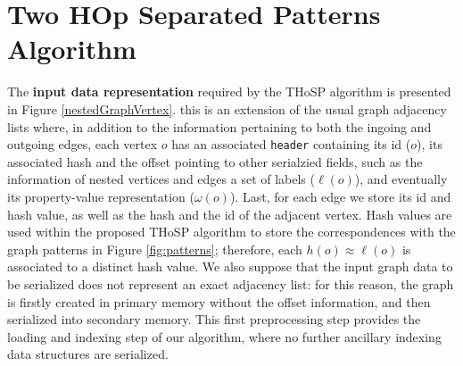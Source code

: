 \section{Two HOp Separated Patterns Algorithm}
\label{sec:THOSPA}


The \textbf{input data  representation} required by the THoSP algorithm is presented in Figure \ref{nestedGraphVertex}. this is an extension of the usual graph adjacency lists where, in addition to the information pertaining to both the ingoing and outgoing edges, each vertex $o$ has an associated \texttt{header} containing its id ($o$), its associated hash and the offset pointing to other serialzied fields, such as the information of   nested vertices and edges a set of labels ($\ell(o)$), and eventually its property-value representation ($\omega(o)$). Last, for each edge we store its id and hash value, as well as the hash and the id of the adjacent vertex. Hash values are used within the proposed THoSP algorithm to store the correspondences with the graph patterns in Figure \ref{fig:patterns}; therefore, each $h(o)\approx \ell(o)$ is associated to a distinct hash value. We also suppose that the input graph data to be serialized does not represent an exact adjacency list: for this reason, the graph is firstly created in primary memory without the offset information, and then serialized into secondary memory. This first preprocessing step provides the loading and indexing step of our algorithm, where no further ancillary indexing data structures are serialized.

